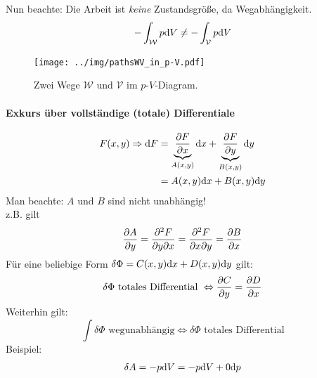\begin{enumerate}[a)]
\begin{equation}
    \end{equation}
    Nun beachte: Die Arbeit ist \emph{keine} Zustandsgröße, da Wegabhängigkeit.
    \begin{equation}
        - \int_\mathcal{W} p \mathrm{d} V \neq - \int_\mathcal{V} p \mathrm{d} V
    \end{equation}
    \begin{figure}[H]
        \begin{center}
            \texttt{[image: ../img/pathsWV\_in\_p-V.pdf]}
            \caption{Zwei Wege $\mathcal{W}$ und $\mathcal{V}$ im $p$-$V$-Diagram.}
            \label{img:pathsVW_in_p-V}
        \end{center}
    \end{figure}
    
    \paragraph{Exkurs über vollständige (totale) Differentiale}
    \begin{equation}
        \begin{split}
            F(x, y) \Rightarrow \mathrm{d} F &= \underbrace{\frac{\partial F}{\partial x}}_{A(x, y)} \mathrm{d} x + \underbrace{\frac{\partial F}{\partial y}}_{B(x, y)} \mathrm{d} y \\
            &= A(x, y) \mathrm{d} x + B(x, y) \mathrm{d} y
        \end{split}
    \end{equation}
    Man beachte: $A$ und $B$ sind nicht unabhängig! \\
    z.B. gilt
    \begin{equation}
        \frac{\partial A}{\partial y} = \frac{\partial^2 F}{\partial y \partial x} = \frac{\partial^2 F}{\partial x \partial y} = \frac{\partial B}{\partial x}
    \end{equation}
    Für eine beliebige Form $\delta \Phi = C(x, y) \mathrm{d} x + D(x, y) \mathrm{d} y$ gilt:
    \begin{equation}
        \delta \Phi \text{ totales Differential } \Leftrightarrow \frac{\partial C}{\partial y} = \frac{\partial D}{\partial x}
    \end{equation}
    Weiterhin gilt:
    \begin{equation}
        \int \delta \Phi \text{ wegunabhängig} \Leftrightarrow \delta \Phi \text{ totales Differential}
    \end{equation}
    Beispiel:
    \begin{equation}
        \begin{split}
            & \delta A = - p \difd V = - p \difd V + 0 \difd p \\

\end{split}
\end{equation}
\end{enumerate}
